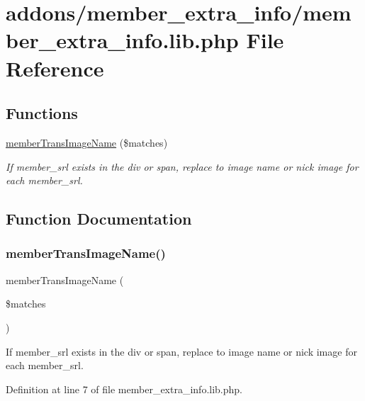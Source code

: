 \hypertarget{member__extra__info_8lib_8php}{}\section{addons/member\+\_\+extra\+\_\+info/member\+\_\+extra\+\_\+info.lib.\+php File Reference}
\label{member__extra__info_8lib_8php}
\subsection*{Functions}
\begin{DoxyCompactItemize}
\item 
\hyperlink{member__extra__info_8lib_8php_a21882e797e0da66aed32f1cf3053eaf2}{member\+Trans\+Image\+Name} (\$matches)
\begin{DoxyCompactList}\small\item\em If member\+\_\+srl exists in the div or span, replace to image name or nick image for each member\+\_\+srl. \end{DoxyCompactList}\end{DoxyCompactItemize}


\subsection{Function Documentation}
\hypertarget{member__extra__info_8lib_8php_a21882e797e0da66aed32f1cf3053eaf2}{}\label{member__extra__info_8lib_8php_a21882e797e0da66aed32f1cf3053eaf2} 
\subsubsection{\texorpdfstring{member\+Trans\+Image\+Name()}{memberTransImageName()}}
{\footnotesize\ttfamily member\+Trans\+Image\+Name (\begin{DoxyParamCaption}\item[{}]{\$matches }\end{DoxyParamCaption})}



If member\+\_\+srl exists in the div or span, replace to image name or nick image for each member\+\_\+srl. 



Definition at line 7 of file member\+\_\+extra\+\_\+info.\+lib.\+php.

